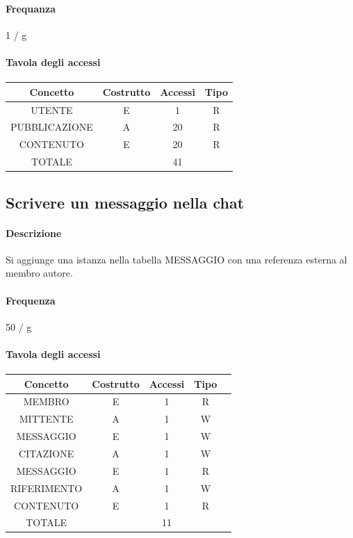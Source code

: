 \documentclass[a4paper,12pt]{report}
\begin{document}
\paragraph{Frequanza} 1 / g
\begin{table}[H]
\paragraph{Tavola degli accessi\newline}
\begin{tabular}{|c|c|c|c|}
\hline
Concetto      & Costrutto & Accessi & Tipo \\ \hline
UTENTE        & E         & 1       & R    \\ \hline
PUBBLICAZIONE & A         & 20      & R    \\ \hline
CONTENUTO     & E         & 20      & R    \\ \hline
TOTALE        &           & 41      &      \\ \hline
\end{tabular}
\end{table}
\subsection{Scrivere un messaggio nella chat} \label{scrivere_messaggio}
\paragraph{Descrizione} Si aggiunge una istanza nella tabella MESSAGGIO con una referenza esterna al membro autore.
\paragraph{Frequenza} 50 / g 
\begin{table}[H]
\paragraph{Tavola degli accessi\newline}
\begin{tabular}{|c|c|c|c|c|}
\hline
Concetto    & Costrutto & Accessi & Tipo \\ \hline
MEMBRO      & E         & 1       & R    \\ \hline
MITTENTE    & A         & 1       & W    \\ \hline
MESSAGGIO   & E         & 1       & W    \\ \hline
CITAZIONE   & A         & 1       & W    \\ \hline
MESSAGGIO   & E         & 1       & R    \\ \hline
RIFERIMENTO & A         & 1       & W    \\ \hline
CONTENUTO   & E         & 1       & R    \\ \hline
TOTALE      &           & 11      &      \\ \hline
\end{tabular}
\end{table}
\end{document}
